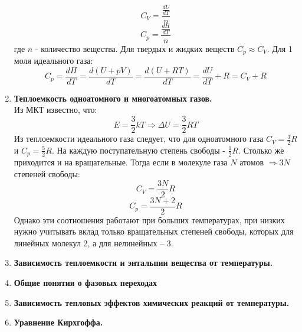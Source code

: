 \documentclass[14pt,a4paper]{scrartcl}
\begin{document}
\begin{enumerate}[label=\arabic*)]
		$$C_V = \dfrac{\frac{dU}{dT}}{n} $$
		$$C_p = \dfrac{\frac{dH}{dT}}{n} $$
		где $n$ - количество вещества. Для твердых и жидких веществ $C_p \approx C_V$. Для 1 моля идеального газа:
		$$C_p = \dfrac{dH}{dT} = \dfrac{d(U+pV)}{dT} = \dfrac{d(U+RT)}{dT} = \dfrac{dU}{dT} + R = C_V + R $$
		\item \textbf{Теплоемкость одноатомного и многоатомных газов.} \\
		Из МКТ известно, что:
		$$E = \dfrac{3}{2} kT \Rightarrow \Delta{U} = \dfrac{3}{2} RT $$
		Из теплоемкости идеального газа следует, что для одноатомного газа $C_V = \frac{3}{2} R $ и $C_p = \frac{5}{2}R$. На каждую поступательную степень свободы - $\frac{1}{2} R$. Столько же приходится и на вращательные. Тогда если в молекуле газа $N$ атомов $\Rightarrow 3N$ степеней свободы:
		$$ C_V = \dfrac{3N}{2} R $$
		$$ C_p = \dfrac{3N+2}{2} R $$
		Однако эти соотношения работают при больших температурах, при низких нужно учитывать вклад только вращательных степеней свободы, которых для линейных молекул 2, а для нелинейных -- 3.
		\item \textbf{Зависимость теплоемкости и энтальпии вещества от температуры.} \\
		\item \textbf{Общие понятия о фазовых переходах} \\		
		\item \textbf{Зависимость тепловых эффектов химических реакций от температуры.} \\		
		\item \textbf{Уравнение Кирхгоффа.} \\		
	\end{enumerate}
\end{document}

